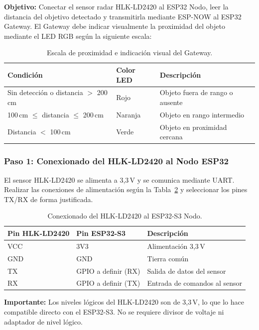 \documentclass[12pt,leqno]{article}
\begin{document}
\textbf{Objetivo:} Conectar el sensor radar HLK-LD2420 al ESP32 Nodo, leer la
distancia del objetivo detectado y transmitirla mediante ESP-NOW al ESP32 Gateway.
El Gateway debe indicar visualmente la proximidad del objeto mediante el LED RGB
seg\'un la siguiente escala:

\begin{table}[h]
\centering
\begin{tabular}{|p{4cm}|p{3cm}|p{6cm}|}
\hline
\textbf{Condici\'on} & \textbf{Color LED} & \textbf{Descripci\'on} \\
\hline
Sin detecci\'on o distancia $>$ 200\,cm & Rojo & Objeto fuera de rango o ausente \\
\hline
100\,cm $\leq$ distancia $\leq$ 200\,cm & Naranja & Objeto en rango intermedio \\
\hline
Distancia $<$ 100\,cm & Verde & Objeto en proximidad cercana \\
\hline
\end{tabular}
\caption{Escala de proximidad e indicaci\'on visual del Gateway.}
\label{tab:escalaproximidad}
\end{table}

\subsubsection*{Paso 1: Conexionado del HLK-LD2420 al Nodo ESP32}

El sensor HLK-LD2420 se alimenta a 3,3\,V y se comunica mediante UART. Realizar las
conexiones de alimentaci\'on seg\'un la Tabla~\ref{tab:conexionradar} y seleccionar
los pines TX/RX de forma justificada.

\begin{table}[h]
\centering
\begin{tabular}{|p{4cm}|p{4cm}|p{5cm}|}
\hline
\textbf{Pin HLK-LD2420} & \textbf{Pin ESP32-S3} & \textbf{Descripci\'on} \\
\hline
VCC & 3V3 & Alimentaci\'on 3,3\,V \\
\hline
GND & GND & Tierra com\'un \\
\hline
TX & GPIO a definir (RX) & Salida de datos del sensor \\
\hline
RX & GPIO a definir (TX) & Entrada de comandos al sensor \\
\hline
\end{tabular}
\caption{Conexionado del HLK-LD2420 al ESP32-S3 Nodo.}
\label{tab:conexionradar}
\end{table}

\noindent\textbf{Importante:} Los niveles l\'ogicos del HLK-LD2420 son de 3,3\,V,
lo que lo hace compatible directo con el ESP32-S3. No se requiere divisor de voltaje
ni adaptador de nivel l\'ogico.
\end{document}
